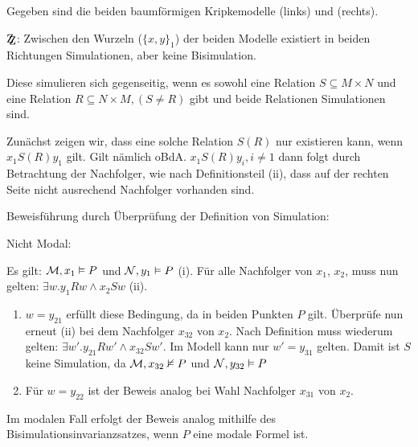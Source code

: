Gegeben sind die beiden baumförmigen Kripkemodelle  (links) und
 (rechts).

$\mathrm{Z\kern-0.4em\raise-0.4ex\hbox{Z}}$: Zwischen den Wurzeln ($\{x,y\}_1$)
der beiden Modelle existiert in beiden Richtungen Simulationen, aber keine
Bisimulation.

Diese simulieren sich gegenseitig, wenn es sowohl eine Relation $S \subseteq M \times
N$ und eine Relation $R \subseteq N \times M, (S \neq R)$ gibt und beide Relationen
Simulationen sind.

Zunächst zeigen wir, dass eine solche Relation $S(R)$ nur existieren kann, wenn
$x_1 S(R) y_1$ gilt. Gilt nämlich oBdA. $x_1 S(R) y_i, i \neq 1$ dann folgt durch
Betrachtung der Nachfolger, wie nach Definitionsteil (ii), dass auf der rechten
Seite nicht ausrechend Nachfolger vorhanden sind.

Beweisführung durch Überprüfung der Definition von Simulation:

Nicht Modal:

Es gilt: $\mathcal{M}, x_1 \vDash P$ und $\mathcal{N},y_1 \vDash P$ (i). Für alle
Nachfolger von $x_1$, $x_2$, muss nun gelten: $\exists w.y_1 R w \wedge x_2 S w$
(ii).
\begin{enumerate}
	\item $w = y_{21}$ erfüllt diese Bedingung, da in beiden Punkten $P$ gilt.
		Überprüfe nun erneut (ii) bei dem Nachfolger $x_{32}$ von $x_2$. Nach
		Definition muss wiederum gelten: $\exists w'.y_{21} R w' \wedge x_{32} S
		w'$. Im Modell  kann nur $w' = y_{31}$ gelten. Damit ist $S$
		keine Simulation, da $\mathcal{M}, x_{32} \nvDash P$ und $\mathcal{N},
		y_{32} \vDash P$
	\item Für $w = y_{22}$ ist der Beweis analog bei Wahl Nachfolger $x_{31}$
		von $x_2$.
\end{enumerate}

Im modalen Fall erfolgt der Beweis analog mithilfe des
Bisimulationsinvarianzsatzes, wenn $P$ eine modale Formel ist.

